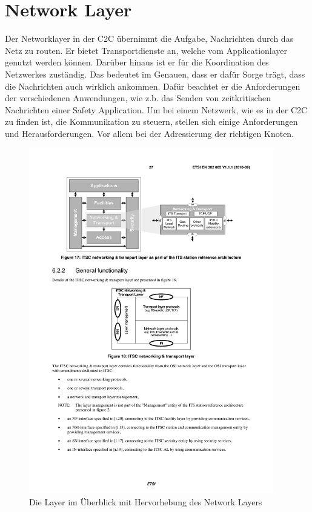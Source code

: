 \chapter{Network Layer\label{chap:networklayer}}
Der Networklayer in der \ac{C2C} übernimmt die Aufgabe, Nachrichten durch das Netz zu routen. Er bietet Transportdienste an, welche vom Applicationlayer genutzt werden können. Darüber hinaus ist er für die Koordination des Netzwerkes zuständig.
Das bedeutet im Genauen, dass er dafür Sorge trägt, dass die Nachrichten auch wirklich ankommen. Dafür beachtet er die Anforderungen der verschiedenen Anwendungen, wie z.b. das Senden von zeitkritischen Nachrichten einer Safety Application. Um bei einem Netzwerk, wie es in der \acl{C2C} zu finden ist, die Kommunikation zu steuern, stellen sich einige Anforderungen und Herausforderungen. Vor allem bei der Adressierung der richtigen Knoten.

\begin{figure}
	\includegraphics[width=0.95\textwidth]{content/images/03_networklayer/uebersichtLayer.pdf}
	\caption{Die Layer im Überblick mit Hervorhebung des Network Layers \cite{en302665}}
\label{fig:layerUeberblick-nwLayer}
\end{figure}


